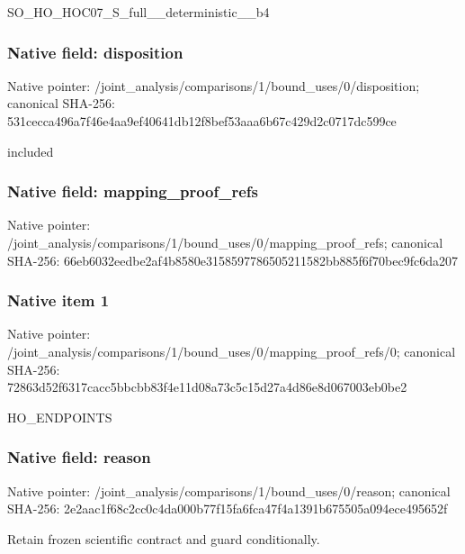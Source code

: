 \documentclass[10pt,a4paper]{article}
\begin{document}
\begingroup\raggedright\sloppy SO\_\allowbreak{}HO\_\allowbreak{}HOC07\_\allowbreak{}S\_\allowbreak{}full\_\allowbreak{}\_\allowbreak{}deterministic\_\allowbreak{}\_\allowbreak{}b4\par\endgroup

\subsubsection{Native field: disposition}
Native pointer: /joint\_\allowbreak{}analysis/comparisons/1/bound\_\allowbreak{}uses/0/disposition; canonical SHA-256: 531cecca496a7f46e4aa9ef40641db12f8bef53aaa6b67c429d2c0717dc599ce

\begingroup\raggedright\sloppy included\par\endgroup

\subsubsection{Native field: mapping\_\allowbreak{}proof\_\allowbreak{}refs}
Native pointer: /joint\_\allowbreak{}analysis/comparisons/1/bound\_\allowbreak{}uses/0/mapping\_\allowbreak{}proof\_\allowbreak{}refs; canonical SHA-256: 66eb6032eedbe2af4b8580e3158597786505211582bb885f6f70bec9fc6da207

\subsubsection{Native item 1}
Native pointer: /joint\_\allowbreak{}analysis/comparisons/1/bound\_\allowbreak{}uses/0/mapping\_\allowbreak{}proof\_\allowbreak{}refs/0; canonical SHA-256: 72863d52f6317cacc5bbcbb83f4e11d08a73c5c15d27a4d86e8d067003eb0be2

\begingroup\raggedright\sloppy HO\_\allowbreak{}ENDPOINTS\par\endgroup

\subsubsection{Native field: reason}
Native pointer: /joint\_\allowbreak{}analysis/comparisons/1/bound\_\allowbreak{}uses/0/reason; canonical SHA-256: 2e2aac1f68c2cc0c4da000b77f15fa6fca47f4a1391b675505a094ece495652f

\begingroup\raggedright\sloppy Retain frozen scientific contract and guard conditionally.\par\endgroup
\end{document}
